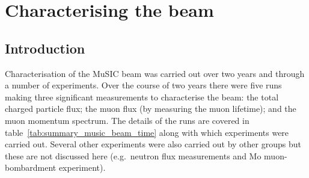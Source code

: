 \chapter{Characterising the beam} %
\label{prt:characterising_the_beam}
\section{Introduction} %
\label{cha:introduction}
Characterisation of the MuSIC beam was carried out over two years and through a number of experiments. Over the course of two years there were five runs making three significant measurements to characterise the beam: the total charged particle flux; the muon flux (by measuring the muon lifetime); and the muon momentum spectrum. The details of the runs are covered in table~\ref{tab:summary_music_beam_time} along with which experiments were carried out. Several other experiments were also carried out by other groups but these are not discussed here (e.g.\ neutron flux measurements and Mo muon-bombardment experiment).
